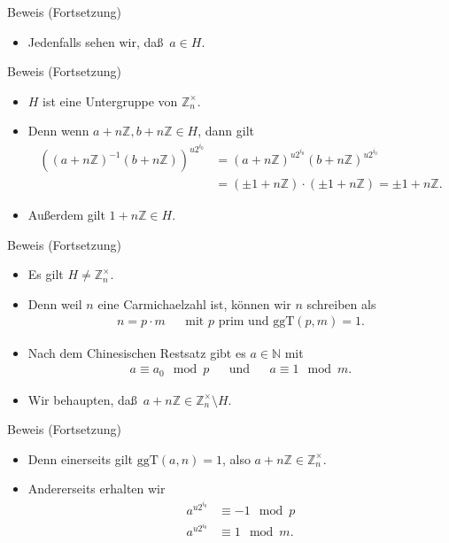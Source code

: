 \documentclass{beamer}
\newcommand\NN{\mathbb N}
\newcommand\ZZ{\mathbb Z}
\newcommand\bc[1]{\left({#1}\right)}
\newcommand{\ggt}{\mathrm{ggT}}
\renewcommand{\oe}{\"o}
\begin{document}
\begin{frame}
\begin{overprint}
\begin{block}{Beweis (Fortsetzung)}
\begin{itemize}
				\item Jedenfalls sehen wir, da\ss\ $a\in H$.
			\end{itemize}
		\end{block}
		\begin{block}{Beweis (Fortsetzung)}
			\begin{itemize}
				\item $H$ ist eine Untergruppe von $\ZZ_n^\times$.
				\item Denn wenn $a+n\ZZ,b+n\ZZ\in H$, dann gilt
					\begin{align*}
						\bc{(a+n\ZZ)^{-1}(b+n\ZZ)}^{u2^{i_0}}&= (a+n\ZZ)^{u2^{i_0}}(b+n\ZZ)^{u2^{i_0}}\\&=(\pm1+n\ZZ)\cdot(\pm1+n\ZZ)=\pm1+n\ZZ.
					\end{align*}
				\item Au\ss erdem gilt $1+n\ZZ\in H$.
			\end{itemize}
		\end{block}
		\begin{block}{Beweis (Fortsetzung)}
			\begin{itemize}
				\item Es gilt $H\neq\ZZ_n^\times$.
				\item Denn weil $n$ eine Carmichaelzahl ist, k\oe nnen wir $n$ schreiben als
					\begin{align*}
						n=p\cdot m&&\mbox{mit $p$ prim und }\ggt(p,m)=1.
					\end{align*}
				\item Nach dem Chinesischen Restsatz gibt es $a\in\NN$ mit
					\begin{align*}
						a\equiv a_0\mod p&&\mbox{und}&&a\equiv1\mod m.
					\end{align*}
				\item Wir behaupten, da\ss\ $a+n\ZZ\in\ZZ_n^\times \setminus H$.
			\end{itemize}
		\end{block}
		\begin{block}{Beweis (Fortsetzung)}
			\begin{itemize}
				\item Denn einerseits gilt $\ggt(a,n)=1$, also $a+n\ZZ\in\ZZ_n^\times$.
				\item Andererseits erhalten wir
					\begin{align*}
						a^{u2^{i_0}}&\equiv-1\mod p\\
						a^{u2^{i_0}}&\equiv1\mod m.
					\end{align*}

\end{itemize}
\end{block}
\end{overprint}
\end{frame}
\end{document}
